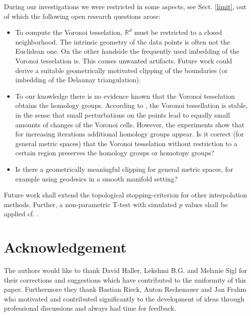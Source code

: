 \documentclass[journal]{IEEEtran}
\begin{document}
During our investigations we were restricted in some aspects, see Sect. \ref{limit}, out of which the following open research questions arose:
\begin{itemize}
  \item To compute the Voronoi tesselation, $\mathbb{R}^d$ must be restricted to a closed neighborhood. The intrinsic geometry of the data points is often not the Euclidean one. On the other handside the frequently used imbedding of the Voronoi tesselation is. This causes unwanted artifacts. Future work could derive a suitable geometrically motivated clipping of the boundaries (or imbedding of the Delaunay triangulation).
  \item To our knowledge there is no evidence known that the Voronoi tesselation obtains the homology groups. According to \cite{reem2011geometric}, the Voronoi tessellation is stable, in the sense that small perturbations on the points lead to equally small amounts of changes of the Voronoi cells. However, the experiments show that for increasing iterations additional homology groups appear. Is it correct (for general metric spaces) that the Voronoi tesselation without restriction to a certain region preserves the homology groups or homotopy groups?
  \item Is there a geometrically meaningful clipping for general metric spaces, for example using geodesics in a smooth manifold setting?
\end{itemize}

Future work shall extend the topological stopping-criterion for other interpolation methods. Further, a non-parametric T-test with simulated $p$ values shall be applied cf. \cite{robinson2017hypothesis, bubenik2015statistical}.

\section*{Acknowledgement}
The authors would like to thank David Haller, Lekshmi B.G. and Melanie Sigl for their corrections and suggestions which have contributed to the uniformity of this paper. Furthermore they thank Bastian Rieck, Anton Rechenauer and Jan Frahm who motivated and contributed significantly to the development of ideas through professional discussions and always had time for feedback.
\end{document}
